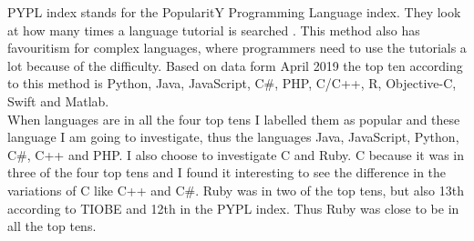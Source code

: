 PYPL index stands for the PopularitY Programming Language index. They look at how many times a language tutorial is searched \cite{car:2019}. This method also has favouritism for complex languages, where programmers need to use the tutorials a lot because of the difficulty. Based on data form April 2019 the top ten according to this method is Python, Java, JavaScript, C\#, PHP, C/C++, R, Objective-C, Swift and Matlab.\\

When languages are in all the four top tens I labelled them as popular and these language I am going to investigate, thus the languages Java, JavaScript, Python, C\#, C++ and PHP. I also choose to investigate C and Ruby. C because it was in three of the four top tens and I found it interesting to see the difference in the variations of C like C++ and C\#. Ruby was in two of the top tens, but also 13th according to TIOBE and 12th in the PYPL index. Thus Ruby was close to be in all the top tens.


%

        
        
        
